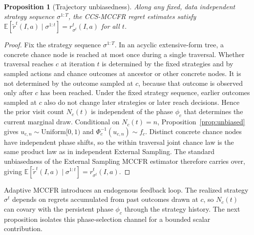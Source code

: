 \documentclass[11pt]{article}
\newtheorem{proposition}{Proposition}
\begin{document}
\begin{proposition}[Trajectory unbiasedness]
\label{prop:traj}
Along any fixed, data independent strategy sequence $\sigma^{1:T}$, the CCS-MCCFR regret estimates satisfy $\mathbb{E}[\tilde{r}^t(I,a) \mid \sigma^{1:t}] = r^t_{\sigma^t}(I,a)$ for all $t$.
\end{proposition}

\begin{proof}
Fix the strategy sequence $\sigma^{1:T}$. In an acyclic extensive-form tree, a concrete chance node is reached at most once during a single traversal. Whether traversal reaches $c$ at iteration $t$ is determined by the fixed strategies and by sampled actions and chance outcomes at ancestor or other concrete nodes. It is not determined by the outcome sampled at $c$, because that outcome is observed only after $c$ has been reached. Under the fixed strategy sequence, earlier outcomes sampled at $c$ also do not change later strategies or later reach decisions. Hence the prior visit count $N_c(t)$ is independent of the phase $\phi_c$ that determines the current marginal draw. Conditional on $N_c(t)=n$, Proposition~\ref{prop:unbiased} gives $u_{c,n}\sim\mathrm{Uniform}[0,1)$ and $\Phi_c^{-1}(u_{c,n})\sim f_c$. Distinct concrete chance nodes have independent phase shifts, so the within traversal joint chance law is the same product law as in independent External Sampling. The standard unbiasedness of the External Sampling MCCFR estimator therefore carries over, giving $\mathbb{E}[\tilde{r}^t(I,a)\mid \sigma^{1:t}]=r^t_{\sigma^t}(I,a)$.
\end{proof}

Adaptive MCCFR introduces an endogenous feedback loop. The realized strategy $\sigma^t$ depends on regrets accumulated from past outcomes drawn at $c$, so $N_c(t)$ can covary with the persistent phase $\phi_c$ through the strategy history. The next proposition isolates this phase-selection channel for a bounded scalar contribution.
\end{document}
